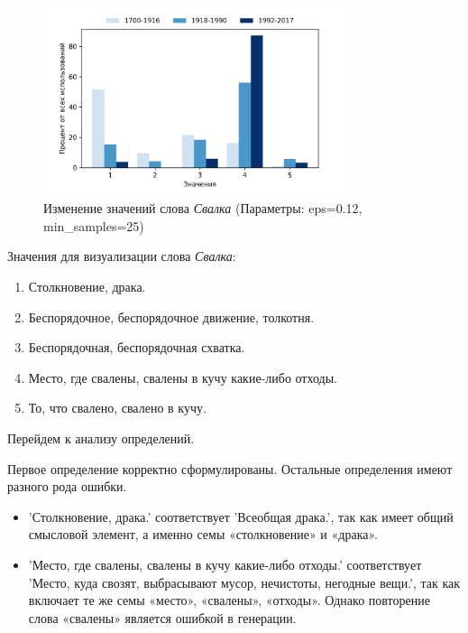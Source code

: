\begin{figure}[H]
	\centering
	\includegraphics[width=0.8\textwidth]{img/visualizations/svalka_minimal}
	\caption{Изменение значений слова \textit{Свалка} (Параметры: eps=0.12, min\_samples=25)}
	\label{fig:Свалка}
\end{figure}

Значения для визуализации слова \textit{Свалка}:

\begin{enumerate}
    \item Столкновение, драка.
    \item Беспорядочное, беспорядочное движение, толкотня.
    \item Беспорядочная, беспорядочная схватка.
    \item Место, где свалены, свалены в кучу какие-либо отходы.
    \item То, что свалено, свалено в кучу.
\end{enumerate}

Перейдем к анализу определений.

Первое определение корректно сформулированы.
Остальные определения имеют разного рода ошибки.

\begin{itemize}
    \item ’Столкновение, драка.’ соответствует ’Всеобщая драка.’, так как
имеет общий смысловой элемент, а именно семы «столкновение» и «драка».

    \item ’Место, где свалены, свалены в кучу какие-либо отходы.’ соответствует
’Место, куда свозят, выбрасывают мусор, нечистоты, негодные вещи.’,
так как включает те же семы «место», «свалены», «отходы».
Однако повторение слова «свалены» является ошибкой в генерации.
\end{itemize}

